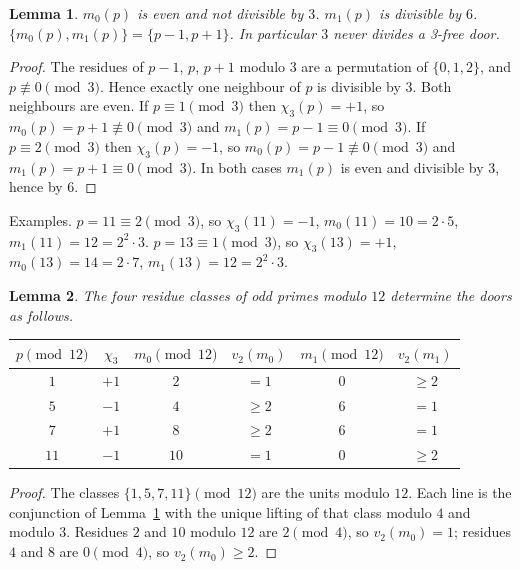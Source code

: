\documentclass[11pt,a4paper]{article}
\newtheorem{lemma}{Lemma}
\begin{document}
\begin{lemma}
\label{lem:doors}
\(m_0(p)\) is even and not divisible by \(3\).
\(m_1(p)\) is divisible by \(6\).
\(\{m_0(p),m_1(p)\}=\{p-1,p+1\}\).
In particular \(3\) never divides a 3-free door.
\end{lemma}

\begin{proof}
The residues of \(p-1\), \(p\), \(p+1\) modulo \(3\) are a permutation of \(\{0,1,2\}\), and \(p\not\equiv 0\pmod{3}\).
Hence exactly one neighbour of \(p\) is divisible by \(3\).
Both neighbours are even.
If \(p\equiv 1\pmod{3}\) then \(\chi_3(p)=+1\), so \(m_0(p)=p+1\not\equiv 0\pmod{3}\) and \(m_1(p)=p-1\equiv 0\pmod{3}\).
If \(p\equiv 2\pmod{3}\) then \(\chi_3(p)=-1\), so \(m_0(p)=p-1\not\equiv 0\pmod{3}\) and \(m_1(p)=p+1\equiv 0\pmod{3}\).
In both cases \(m_1(p)\) is even and divisible by \(3\), hence by \(6\).
\end{proof}

\noindent
Examples.
\(p=11\equiv 2\pmod{3}\), so \(\chi_3(11)=-1\), \(m_0(11)=10=2\cdot 5\), \(m_1(11)=12=2^2\cdot 3\).
\(p=13\equiv 1\pmod{3}\), so \(\chi_3(13)=+1\), \(m_0(13)=14=2\cdot 7\), \(m_1(13)=12=2^2\cdot 3\).

\begin{lemma}
\label{lem:mod12}
The four residue classes of odd primes modulo \(12\) determine the doors as follows.
\end{lemma}

\begin{center}
\small
\begin{tabular}{@{}cccccc@{}}
\toprule
\(p\pmod{12}\) & \(\chi_3\) & \(m_0\pmod{12}\) & \(v_2(m_0)\) & \(m_1\pmod{12}\) & \(v_2(m_1)\) \\
\midrule
\(1\)  & \(+1\) & \(2\)  & \(=1\) & \(0\) & \(\ge 2\) \\
\(5\)  & \(-1\) & \(4\)  & \(\ge 2\) & \(6\) & \(=1\) \\
\(7\)  & \(+1\) & \(8\)  & \(\ge 2\) & \(6\) & \(=1\) \\
\(11\) & \(-1\) & \(10\) & \(=1\) & \(0\) & \(\ge 2\) \\
\bottomrule
\end{tabular}
\end{center}

\begin{proof}
The classes \(\{1,5,7,11\}\pmod{12}\) are the units modulo \(12\).
Each line is the conjunction of Lemma~\ref{lem:doors} with the unique lifting of that class modulo \(4\) and modulo \(3\).
Residues \(2\) and \(10\) modulo \(12\) are \(2\pmod{4}\), so \(v_2(m_0)=1\); residues \(4\) and \(8\) are \(0\pmod{4}\), so \(v_2(m_0)\ge 2\).
\end{proof}
\end{document}
